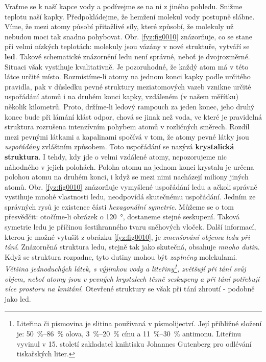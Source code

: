     Vraťme se k naší kapce vody a podívejme se na ni z jiného pohledu. Snižme teplotu naší kapky.
    Předpokládejme, že hemžení molekul vody postupně slábne. Víme, že mezi atomy působí přitažlivé
    síly, které způsobí, že molekuly už nebudou moci tak snadno pohybovat. Obr. \ref{fyz:fig0010}
    znázorňuje, co se stane při velmi nízkých teplotách: molekuly jsou vázány v nové struktuře,
    vytváří se \textbf{led}. Takové schematické znázornění ledu není správné, neboť je dvojrozměrné.
    Situaci však vystihuje kvalitativně. Je pozoruhodné, že každý atom má v této látce určité místo.
    Rozmístíme-li atomy na jednom konci kapky podle určitého pravidla, pak v důsledku pevné
    struktury meziatomových vazeb vznikne určité uspořádání atomů i na druhém konci kapky, vzdáleném
    (v našem měřítku) několik kilometrů. Proto, držíme-li ledový rampouch za jeden konec, jeho druhý
    konec bude při lámání klást odpor, chová se jinak než voda, ve které je pravidelná struktura
    rozrušena intenzívním pohybem atomů v rozličných směrech. Rozdíl mezi pevnými látkami a
    kapalinami spočívá v tom, že atomy pevné látky jsou \emph{uspořádány} zvláštním způsobem. Toto
    uspořádání se nazývá \textbf{krystalická struktura}. I tehdy, kdy jde o velmi vzdálené atomy,
    nepozorujeme nic náhodného v jejich polohách. Poloha atomu na jednom konci krystalu je určena
    polohou atomu na druhém konci, i když se mezi nimi nacházejí miliony jiných atomů. Obr.
    \ref{fyz:fig0010} znázorňuje vymyšlené uspořádání ledu a ačkoli správně vystihuje mnohé
    vlastnosti ledu, neodpovídá skutečnému uspořádání. Jedním ze správných rysů je existence části
    \emph{hexagonální symetrie}. Můžeme se o tom přesvědčit: otočíme-li obrázek o \SI{120}{\degree},
    dostaneme stejné seskupení. Taková symetrie ledu je příčinou šestihranného tvaru sněhových
    vloček. Další informací, kterou je možné vytušit z obrázku \ref{fyz:fig0010}, je \emph{zmenšování
    objemu ledu při tání}. Znázorněná struktura ledu, stejně tak jako skutečná, obsahuje \emph{mnoho
    dutin}. Když se struktura rozpadne, tyto dutiny mohou být \emph{zaplněny} molekulami.
    \emph{Většina jednoduchých látek, s výjimkou vody a liteřiny\footnote{Liteřina či písmovina je
    slitina používaná v písmolijectví. Její přibližné složení je: \SIrange{50}{86}{\percent} olova,
    \SIrange{3}{20}{\percent} cínu a \SIrange{11}{30}{\percent} antimonu. Liteřinu vyvinul v 15.
    století zakladatel knihtisku Johannes Gutenberg pro odlévání tiskařských liter.}, zvětšují při
    tání svůj objem, neboť atomy jsou v pevných krystalech těsně seskupeny a při tání potřebují více
    prostoru na kmitání}. Otevřené struktury se však při tání zhroutí - podobně jako led.
    

